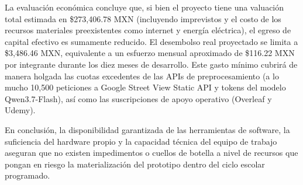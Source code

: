 \begin{itemize}
    La evaluación económica concluye que, si bien el proyecto tiene una valuación total estimada en \$273,406.78 MXN (incluyendo imprevistos y el costo de los recursos materiales preexistentes como internet y energía eléctrica), el egreso de capital efectivo es sumamente reducido. El desembolso real proyectado se limita a \$3,486.46 MXN, equivalente a un esfuerzo mensual aproximado de \$116.22 MXN por integrante durante los diez meses de desarrollo. Este gasto mínimo cubrirá de manera holgada las cuotas excedentes de las APIs de preprocesamiento (a lo mucho 10,500 peticiones a Google Street View Static API y tokens del modelo Qwen3.7-Flash), así como las suscripciones de apoyo operativo (Overleaf y Udemy).
\end{itemize}

En conclusión, la disponibilidad garantizada de las herramientas de software, la suficiencia del hardware propio y la capacidad técnica del equipo de trabajo aseguran que no existen impedimentos o cuellos de botella a nivel de recursos que pongan en riesgo la materialización del prototipo dentro del ciclo escolar programado.